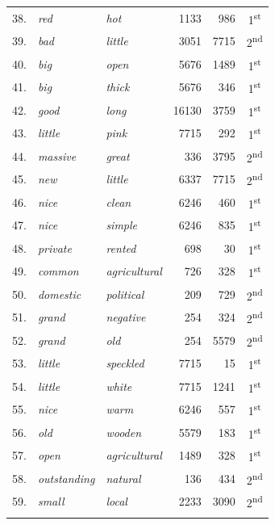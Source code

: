 \begin{table}
{\begin{tabular}[t]{rllrrc}
38. & \textit{red} & \textit{hot} & \num{1133} & \num{986} & 1\textsuperscript{st} \\
39. & \textit{bad} & \textit{little} & \num{3051} & \num{7715} & 2\textsuperscript{nd} \\
40. & \textit{big} & \textit{open} & \num{5676} & \num{1489} & 1\textsuperscript{st} \\
41. & \textit{big} & \textit{thick} & \num{5676} & \num{346} & 1\textsuperscript{st} \\
42. & \textit{good} & \textit{long} & \num{16130} & \num{3759} & 1\textsuperscript{st} \\
43. & \textit{little} & \textit{pink} & \num{7715} & \num{292} & 1\textsuperscript{st} \\
44. & \textit{massive} & \textit{great} & \num{336} & \num{3795} & 2\textsuperscript{nd} \\
45. & \textit{new} & \textit{little} & \num{6337} & \num{7715} & 2\textsuperscript{nd} \\
46. & \textit{nice} & \textit{clean} & \num{6246} & \num{460} & 1\textsuperscript{st} \\
47. & \textit{nice} & \textit{simple} & \num{6246} & \num{835} & 1\textsuperscript{st} \\
48. & \textit{private} & \textit{rented} & \num{698} & \num{30} & 1\textsuperscript{st} \\
49. & \textit{common} & \textit{agricultural} & \num{726} & \num{328} & 1\textsuperscript{st} \\
50. & \textit{domestic} & \textit{political} & \num{209} & \num{729} & 2\textsuperscript{nd} \\
51. & \textit{grand} & \textit{negative} & \num{254} & \num{324} & 2\textsuperscript{nd} \\
52. & \textit{grand} & \textit{old} & \num{254} & \num{5579} & 2\textsuperscript{nd} \\
53. & \textit{little} & \textit{speckled} & \num{7715} & \num{15} & 1\textsuperscript{st} \\
54. & \textit{little} & \textit{white} & \num{7715} & \num{1241} & 1\textsuperscript{st} \\
55. & \textit{nice} & \textit{warm} & \num{6246} & \num{557} & 1\textsuperscript{st} \\
56. & \textit{old} & \textit{wooden} & \num{5579} & \num{183} & 1\textsuperscript{st} \\
57. & \textit{open} & \textit{agricultural} & \num{1489} & \num{328} & 1\textsuperscript{st} \\
58. & \textit{outstanding} & \textit{natural} & \num{136} & \num{434} & 2\textsuperscript{nd} \\
59. & \textit{small} & \textit{local} & \num{2233} & \num{3090} & 2\textsuperscript{nd} \\
\lspbottomrule
\end{tabular}}
\end{table}

